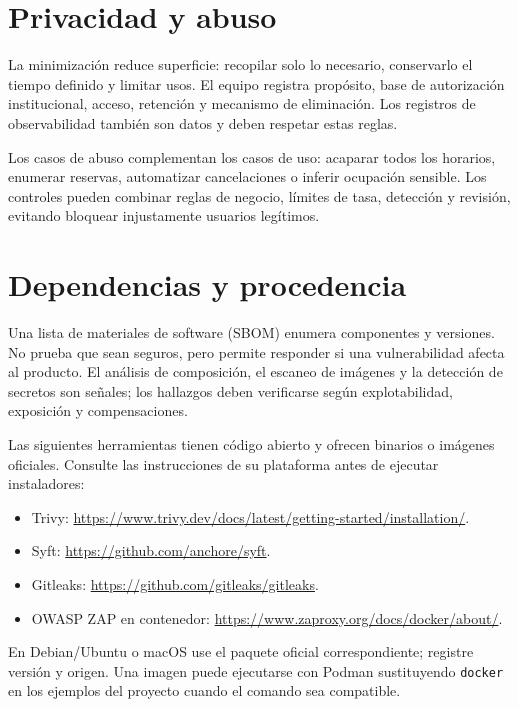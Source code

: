 \section{Privacidad y abuso}

La minimización reduce superficie: recopilar solo lo necesario, conservarlo el tiempo definido y limitar usos. El equipo registra propósito, base de autorización institucional, acceso, retención y mecanismo de eliminación. Los registros de observabilidad también son datos y deben respetar estas reglas.

Los casos de abuso complementan los casos de uso: acaparar todos los horarios, enumerar reservas, automatizar cancelaciones o inferir ocupación sensible. Los controles pueden combinar reglas de negocio, límites de tasa, detección y revisión, evitando bloquear injustamente usuarios legítimos.

\section{Dependencias y procedencia}

Una lista de materiales de software (SBOM) enumera componentes y versiones. No prueba que sean seguros, pero permite responder si una vulnerabilidad afecta al producto. El análisis de composición, el escaneo de imágenes y la detección de secretos son señales; los hallazgos deben verificarse según explotabilidad, exposición y compensaciones.

\begin{instalacion}
Las siguientes herramientas tienen código abierto y ofrecen binarios o imágenes oficiales. Consulte las instrucciones de su plataforma antes de ejecutar instaladores:
\begin{itemize}
  \item Trivy: \url{https://www.trivy.dev/docs/latest/getting-started/installation/}.
  \item Syft: \url{https://github.com/anchore/syft}.
  \item Gitleaks: \url{https://github.com/gitleaks/gitleaks}.
  \item OWASP ZAP en contenedor: \url{https://www.zaproxy.org/docs/docker/about/}.
\end{itemize}
En Debian/Ubuntu o macOS use el paquete oficial correspondiente; registre versión y origen. Una imagen puede ejecutarse con Podman sustituyendo \texttt{docker} en los ejemplos del proyecto cuando el comando sea compatible.
\end{instalacion}

